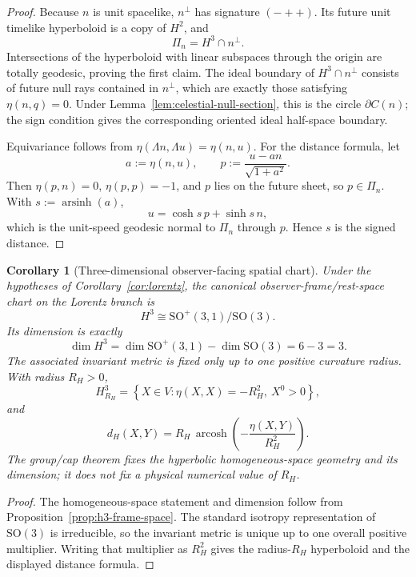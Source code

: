 \documentclass[11pt]{article}
\newtheorem{corollary}[theorem]{Corollary}
\begin{document}
\begin{proof}
Because \(n\) is unit spacelike, \(n^\perp\) has signature \((-++)\). Its
future unit timelike hyperboloid is a copy of \(H^2\), and
\[
\Pi_n=H^3\cap n^\perp.
\]
Intersections of the hyperboloid with linear subspaces through the origin are
totally geodesic, proving the first claim. The ideal boundary of
\(H^3\cap n^\perp\) consists of future null rays contained in \(n^\perp\),
which are exactly those satisfying \(\eta(n,q)=0\). Under
Lemma~\ref{lem:celestial-null-section}, this is the circle \(\partial C(n)\);
the sign condition gives the corresponding oriented ideal half-space boundary.

Equivariance follows from \(\eta(\Lambda n,\Lambda u)=\eta(n,u)\). For the
distance formula, let
\[
a:=\eta(n,u),
\qquad
p:=\frac{u-a n}{\sqrt{1+a^2}}.
\]
Then \(\eta(p,n)=0\), \(\eta(p,p)=-1\), and \(p\) lies on the future sheet, so
\(p\in\Pi_n\). With \(s:=\operatorname{arsinh}(a)\),
\[
u=\cosh s\,p+\sinh s\,n,
\]
which is the unit-speed geodesic normal to \(\Pi_n\) through \(p\). Hence
\(s\) is the signed distance.
\end{proof}

\begin{corollary}[Three-dimensional observer-facing spatial chart]
\label{cor:h3-spatial-chart}
Under the hypotheses of Corollary~\ref{cor:lorentz}, the canonical
observer-frame/rest-space chart on the Lorentz branch is
\[
\boxed{
H^3\cong\mathrm{SO}^{+}(3,1)/\mathrm{SO}(3).
}
\]
Its dimension is exactly
\[
\boxed{
\dim H^3=\dim\mathrm{SO}^{+}(3,1)-\dim\mathrm{SO}(3)=6-3=3.
}
\]
The associated invariant metric is fixed only up to one positive curvature
radius. With radius \(R_H>0\),
\[
H^3_{R_H}=\left\{X\in V:\eta(X,X)=-R_H^2,\ X^0>0\right\},
\]
and
\[
d_H(X,Y)=
R_H\,
\operatorname{arcosh}
\left(-\frac{\eta(X,Y)}{R_H^2}\right).
\]
The group/cap theorem fixes the hyperbolic homogeneous-space geometry and its
dimension; it does not fix a physical numerical value of \(R_H\).
\end{corollary}

\begin{proof}
The homogeneous-space statement and dimension follow from
Proposition~\ref{prop:h3-frame-space}. The standard isotropy representation
of \(\mathrm{SO}(3)\) is irreducible, so the invariant metric is unique up to
one overall positive multiplier. Writing that multiplier as \(R_H^2\) gives
the radius-\(R_H\) hyperboloid and the displayed distance formula.
\end{proof}
\end{document}
